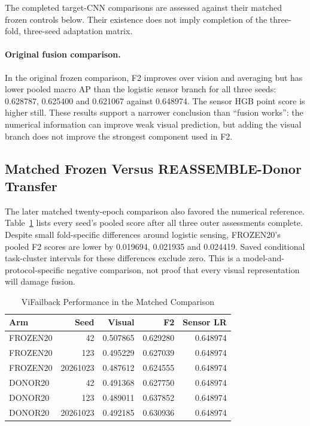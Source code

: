 The completed target-CNN comparisons are assessed against their matched frozen controls
below. Their existence does not imply completion of the three-fold, three-seed
adaptation matrix.

\paragraph{Original fusion comparison.}
In the original frozen comparison, F2 improves over vision and averaging but has lower
pooled macro AP than the logistic sensor branch for all three seeds: 0.628787, 0.625400
and 0.621067 against 0.648974. The sensor HGB point score is higher still. These results
support a narrower conclusion than ``fusion works'': the numerical information can
improve weak visual prediction, but adding the visual branch does not improve the
strongest component used in F2.

\subsection{Matched Frozen Versus REASSEMBLE-Donor Transfer}
The later matched twenty-epoch comparison also favored the numerical reference.
Table~\ref{tab:vif-matched} lists every seed's pooled score after all three outer
assessments complete. Despite small fold-specific differences around logistic sensing,
FROZEN20's pooled F2 scores are lower by 0.019694, 0.021935 and 0.024419. Saved
conditional task-cluster intervals for these differences exclude zero. This is a
model-and-protocol-specific negative comparison, not proof that every visual
representation will damage fusion.

\begin{table}[htbp]
\caption{ViFailback Performance in the Matched Comparison}\label{tab:vif-matched}
\centering\small

\begin{tabular}{lrrrr}\hline Arm&Seed&Visual&F2&Sensor LR\\\hline
FROZEN20&42&0.507865&0.629280&0.648974\\
FROZEN20&123&0.495229&0.627039&0.648974\\
FROZEN20&20261023&0.487612&0.624555&0.648974\\
DONOR20&42&0.491368&0.627750&0.648974\\
DONOR20&123&0.489011&0.637852&0.648974\\
DONOR20&20261023&0.492185&0.630936&0.648974\\\hline
\end{tabular}
\end{table}

